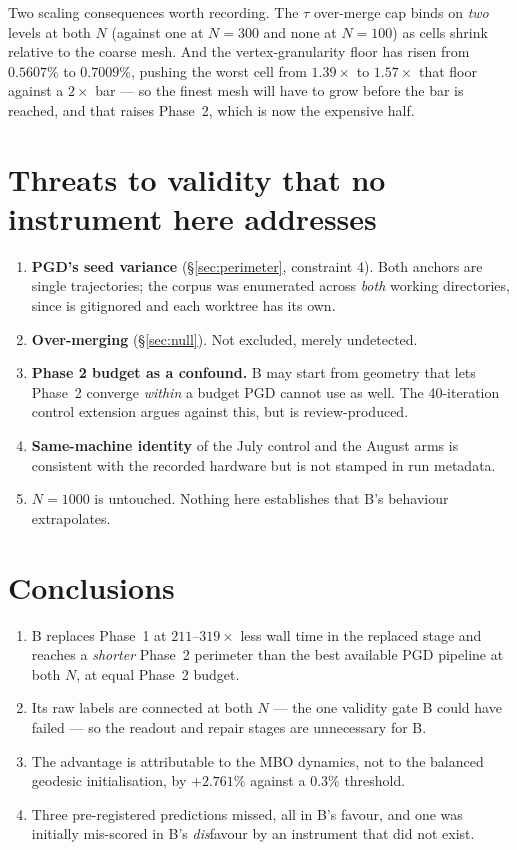 \documentclass[11pt,a4paper]{article}
\begin{document}
Two scaling consequences worth recording. The \(\tau\) over-merge cap binds on
\emph{two} levels at both \(N\) (against one at \(N{=}300\) and none at
\(N{=}100\)) as cells shrink relative to the coarse mesh. And the
vertex-granularity floor has risen from \(0.5607\%\) to \(0.7009\%\), pushing the
worst cell from \(1.39\times\) to \(1.57\times\) that floor against a \(2\times\)
bar --- so the finest mesh will have to grow before the bar is reached, and that
raises Phase~2, which is now the expensive half.

\section{Threats to validity that no instrument here addresses}
\label{sec:threats}

\begin{enumerate}\itemsep2pt
\item \textbf{PGD's seed variance} (\S\ref{sec:perimeter}, constraint 4). Both
  anchors are single trajectories; the corpus was enumerated across \emph{both}
  working directories, since  is gitignored and each worktree has
  its own.
\item \textbf{Over-merging} (\S\ref{sec:null}). Not excluded, merely undetected.
\item \textbf{Phase 2 budget as a confound.} B may start from geometry that lets
  Phase~2 converge \emph{within} a budget PGD cannot use as well. The 40-iteration
  control extension argues against this, but is review-produced.
\item \textbf{Same-machine identity} of the July control and the August arms is
  consistent with the recorded hardware but is not stamped in run metadata.
\item \textbf{\(N{=}1000\)} is untouched. Nothing here establishes that B's
  behaviour extrapolates.
\end{enumerate}

\section{Conclusions}
\begin{enumerate}\itemsep2pt
\item B replaces Phase~1 at \(211\text{--}319\times\) less wall time in the replaced
  stage and reaches a \emph{shorter} Phase~2 perimeter than the best available PGD
  pipeline at both \(N\), at equal Phase~2 budget.
\item Its raw labels are connected at both \(N\) --- the one validity gate B could
  have failed --- so the readout and repair stages are unnecessary for B.
\item The advantage is attributable to the MBO dynamics, not to the balanced
  geodesic initialisation, by \(+2.761\%\) against a \(0.3\%\) threshold.
\item Three pre-registered predictions missed, all in B's favour, and one was
  initially mis-scored in B's \emph{dis}favour by an instrument that did not exist.
\end{enumerate}
\end{document}

